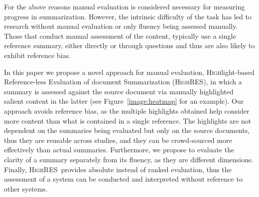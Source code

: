 \documentclass[11pt,a4paper]{article}
\newcommand\highres{\textsc{HighRES}}
\begin{document}
For the above reasons manual evaluation is considered necessary for measuring progress in summarization. However, the intrinsic difficulty of the task has led to research without manual evaluation or only fluency being assessed manually.  Those that conduct manual assessment of the content, typically use a single reference summary, either directly \citep{Celikyilmaz2018, Tan2017} or through questions \citep{narayan18xsum,Narayan2018} and thus are also likely to exhibit reference bias. 


In this paper we propose a novel approach for manual evaluation, \textsc{High}light-based \textsc{R}eference-less \textsc{E}valuation of document \textsc{S}ummarization (\highres), in which a summary is assessed against the source document via manually highlighted salient content in the latter (see Figure~\ref{image:heatmap} for an example). Our approach avoids reference bias, as the multiple highlights obtained help consider more content than what is contained in a single reference. The highlights are not dependent on the summaries being evaluated but only on the source documents, thus they are reusable across studies, and they can be crowd-sourced more effectively than actual summaries. %
Furthermore, we propose to evaluate the clarity of a summary separately from its fluency, as they are different dimensions.
Finally, \highres\ provides absolute instead of ranked evaluation, thus the assessment of a system can be conducted and interpreted without reference to other systems.

\end{document}
